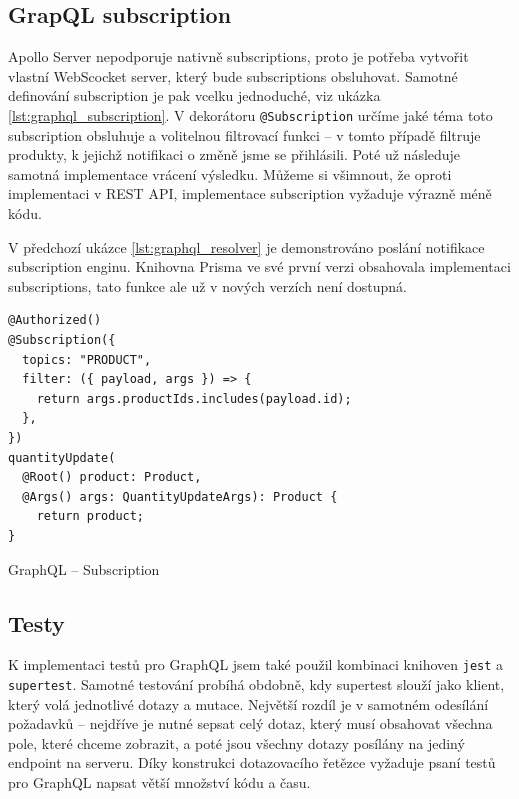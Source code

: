 \documentclass[thesis=M,czech]{FITthesis}[2019/12/23]
\begin{document}
\subsection{GrapQL subscription}
Apollo Server nepodporuje nativně subscriptions, proto je potřeba vytvořit vlastní WebScocket server, který bude subscriptions obsluhovat. Samotné definování subscription je pak vcelku jednoduché, viz ukázka \ref{lst:graphql_subscription}. V dekorátoru \texttt{@Subscription} určíme jaké téma toto subscription obsluhuje a volitelnou filtrovací funkci -- v tomto případě filtruje produkty, k jejichž notifikaci o změně jsme se přihlásili. Poté už následuje samotná implementace vrácení výsledku. Můžeme si všimnout, že oproti implementaci v REST API, implementace subscription vyžaduje výrazně méně kódu.

V předchozí ukázce \ref{lst:graphql_resolver} je demonstrováno poslání notifikace subscription enginu. Knihovna Prisma ve své první verzi obsahovala implementaci subscriptions, tato funkce ale už v nových verzích není dostupná.

\begin{listing}[H]
\begin{verbatim}
@Authorized()
@Subscription({
  topics: "PRODUCT",
  filter: ({ payload, args }) => {
    return args.productIds.includes(payload.id);
  },
})
quantityUpdate(
  @Root() product: Product,
  @Args() args: QuantityUpdateArgs): Product {
    return product;
}
\end{verbatim}
\caption{GraphQL -- Subscription}
\label{lst:graphql_subscription}
\end{listing}

\subsection{Testy}
K implementaci testů pro GraphQL jsem také použil kombinaci knihoven \texttt{jest} a \texttt{supertest}. Samotné testování probíhá obdobně, kdy supertest slouží jako klient, který volá jednotlivé dotazy a mutace. Největší rozdíl je v samotném odesílání požadavků -- nejdříve je nutné sepsat celý dotaz, který musí obsahovat všechna pole, které chceme zobrazit, a poté jsou všechny dotazy posílány na jediný endpoint na serveru. Díky konstrukci dotazovacího řetězce vyžaduje psaní testů pro GraphQL napsat větší množství kódu a času.
\end{document}
